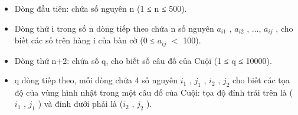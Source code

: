 \begin{itemize}
	\item Dòng đầu tiên: chứa số nguyên n (1 ≤ n ≤ 500).
	\item Dòng thứ i trong số n dòng tiếp theo chứa n số nguyên $a_{i1}$ , $a_{i2}$ , ..., $a_{ij}$ , cho biết các số trên hàng i của bàn cờ (0 ≤ $a_{ij}$ $<$ 100).
	\item Dòng thứ n+2: chứa số q, cho biết số câu đố của Cuội (1 ≤ q ≤ 10000).
	\item q dòng tiếp theo, mỗi dòng chứa 4 số nguyên $i_{1}$ , $j_{1}$ , $i_{2}$ , $j_{2}$ cho biết các tọa độ của vùng hình nhật trong một câu đố của Cuội: tọa độ đỉnh trái trên là ($i_{1}$ , $j_{1}$ ) và đỉnh dưới phải là ($i_{2}$ , $j_{2}$ ).
\end{itemize}